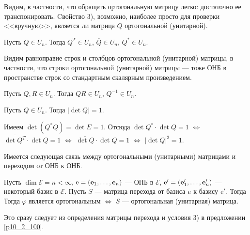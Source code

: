 \otstup

Видим, в частности, что обращать ортогональную матрицу легко: достаточно ее транспонировать.
Cвойство 3), возможно, наиболее просто для проверки <<вручную>>, 
является ли матрица $Q$ ортогональной (унитарной).


\begin{predl}\label{p10_2_101} 
Пусть  $Q\in U_n$. Тогда $Q^T \in U_n$, $\overline{Q} \in U_n$,  $Q^{*} \in U_n$.
\end{predl}
\dok 
\edok

\otstup

Видим равноправие строк и столбцов ортогональной (унитарной) матрицы, в частности, что строки ортогональной (унитарной) матрицы --- тоже ОНБ в пространстве строк со стандартным скалярным произведением.

\begin{predl}\label{p10_2_102} 
Пусть  $Q, R\in U_n$. Тогда $QR\in U_n$, $Q^{-1} \in U_n $.
\end{predl}
\dok 
\edok

\begin{predl}\label{p10_2_103} 
Пусть  $Q\in U_n$. Тогда $|\det Q| = 1$.
\end{predl}
\dok 
Имеем $\det (Q^{*}Q)=\det E = 1$. Отсюда $\det Q^{*}\cdot \det Q= 1$ $\Leftrightarrow$
$\overline{\det Q^{T}}\cdot \det Q= 1$ $\Leftrightarrow$
$\overline{\det Q}\cdot \det Q= 1$ $\Leftrightarrow$ $|\det Q|^2 = 1$.
\edok

\otstup

Имеется следующая связь между ортогональными (унитарными) матрицами и переходом от ОНБ к ОНБ.

\begin{theor}\label{t10_2_104} 
Пусть $\dim \mathcal{E}=n<\infty $, $\mathrm{e}=(\mathbf{e}_1, \ldots, \mathbf{e}_n)$ --- ОНБ в $\mathcal{E}$,
$\mathrm{e}'=(\mathbf{e}'_1, \ldots, \mathbf{e}'_n)$ --- некоторый базис в $\mathcal{E}$. Пусть $S$ --- матрица перехода от  
базиса $\mathrm{e}$ к базису $\mathrm{e}'$. Тогда\\
Тогда $\varphi$ является ортогональным  $\Leftrightarrow$ $S$ --- ортогональная (унитарная) матрица.
\end{theor}
\dok 
Это сразу следует из определения матрицы перехода и условия 3) в предложении \ref{p10_2_100}.
\edok

